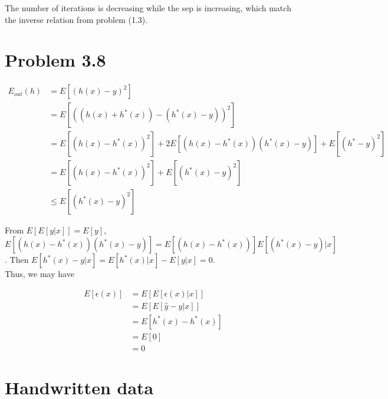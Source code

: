 \documentclass{article}
\def\math#1{$#1$}
\begin{document}
The number of iterations is decreasing while the sep is increasing, which match the inverse relation from problem (1.3).

\section{Problem 3.8}

\begin{equation}
    \begin{split}
        E_{out}(h) &= E[(h(x) - y)^2] \\
        &= E[((h(x) + h^*(x)) - (h^*(x) - y))^2] \\
        &= E[(h(x) - h^*(x))^2] + 2E[(h(x) - h^*(x))(h^*(x) - y)] + E[(h^* - y)^2] \\
        &= E[(h(x) - h^*(x))^2] + E[(h^*(x) - y)^2] \\
        &\leq E[(h^*(x) - y)^2]
    \end{split}
\end{equation}

From \math{E[E[y|x]] = E[y]}, \math{E[(h(x) - h^*(x))(h^*(x) - y)] = E[(h(x) - h^*(x))]E[(h^*(x) - y)|x]}. Then \math{E[h^*(x) - y|x] = E[h^*(x)|x] - E[y|x] = 0}. \\

Thus, we may have

\begin{equation}
    \begin{split}
        E[\epsilon(x)] &= E[E[\epsilon(x)|x]] \\
        &= E[E[\hat{y} - y|x]] \\
        &= E[h^*(x) - h^*(x)] \\
        &= E[0] \\
        &= 0
    \end{split}
\end{equation}

\section{Handwritten data}
\end{document}
